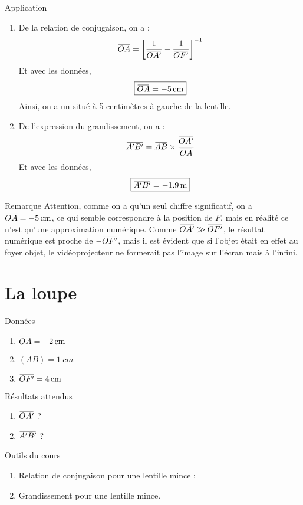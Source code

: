 \documentclass[10pt,a5paper,notitlepage]{book}
\begin{document}
\begin{NCexem}{Application}
    \begin{enumerate}
        \item De la relation de conjugaison, on a :
            \[\OA = \left[ \frac{1}{\OAp} - \frac{1}{\OF} \right]^{-1}\]
            Et avec les données,
            \[ \boxed{\OA = \SI{- 5}{cm}}\]
            Ainsi, on a un  situé à 5 centimètres à gauche de
            la lentille.

        \item De l'expression du grandissement, on a :
            \[\ABp = \ABb\times\frac{\OAp}{\OA}\]
            Et avec les données,
            \[ \boxed{\ABp = \SI{- 1.9}{m}} \]
    \end{enumerate}
\end{NCexem}

\begin{NCrema}{Remarque}
    Attention, comme on a qu'un seul chiffre significatif, on a $\OA =
    \SI{-5}{cm}$, ce qui semble correspondre à la position de $F$, mais en
    réalité ce n'est qu'une approximation numérique. Comme $\OAp \gg \OF$, le
    résultat numérique est proche de $-\OF$, mais il est évident que si l'objet
    était en effet au foyer objet, le vidéoprojecteur ne formerait pas l'image
    sur l'écran mais à l'infini.
\end{NCrema}

\section{La loupe}
\begin{NCdefi}{Données}
    \begin{enumerate}
        \item $\OA = \SI{-2}{cm}$
        \item $(AB) = \SI{1}{cm}$
        \item $\OF = \SI{4}{cm}$
    \end{enumerate}
\end{NCdefi}

\begin{NCprop}{Résultats attendus}
    \begin{enumerate}
        \item $\OAp$ ?
        \item $\ABp$ ?
    \end{enumerate}
\end{NCprop}

\begin{NCdemo}{Outils du cours}
   \begin{enumerate}
       \item Relation de conjugaison pour une lentille mince ;
       \item Grandissement pour une lentille mince.
   \end{enumerate} 
\end{NCdemo}
\end{document}
